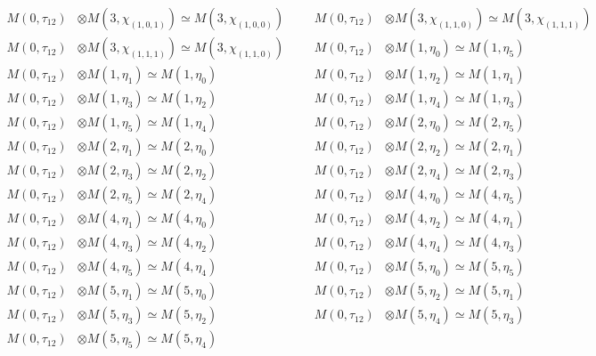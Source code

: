 \begin{align*}
M(0,\tau_{12}) &\otimes M(3,\chi_{(1,0,1)}) \simeq M(3,\chi_{(1,0,0)}) &&& M(0,\tau_{12}) &\otimes M(3,\chi_{(1,1,0)}) \simeq M(3,\chi_{(1,1,1)})\\
M(0,\tau_{12}) &\otimes M(3,\chi_{(1,1,1)}) \simeq M(3,\chi_{(1,1,0)}) &&& M(0,\tau_{12}) &\otimes M(1,\eta_{0}) \simeq M(1,\eta_{5})\\
M(0,\tau_{12}) &\otimes M(1,\eta_{1}) \simeq M(1,\eta_{0}) &&& M(0,\tau_{12}) &\otimes M(1,\eta_{2}) \simeq M(1,\eta_{1})\\
M(0,\tau_{12}) &\otimes M(1,\eta_{3}) \simeq M(1,\eta_{2}) &&& M(0,\tau_{12}) &\otimes M(1,\eta_{4}) \simeq M(1,\eta_{3})\\
M(0,\tau_{12}) &\otimes M(1,\eta_{5}) \simeq M(1,\eta_{4}) &&& M(0,\tau_{12}) &\otimes M(2,\eta_{0}) \simeq M(2,\eta_{5})\\
M(0,\tau_{12}) &\otimes M(2,\eta_{1}) \simeq M(2,\eta_{0}) &&& M(0,\tau_{12}) &\otimes M(2,\eta_{2}) \simeq M(2,\eta_{1})\\
M(0,\tau_{12}) &\otimes M(2,\eta_{3}) \simeq M(2,\eta_{2}) &&& M(0,\tau_{12}) &\otimes M(2,\eta_{4}) \simeq M(2,\eta_{3})\\
M(0,\tau_{12}) &\otimes M(2,\eta_{5}) \simeq M(2,\eta_{4}) &&& M(0,\tau_{12}) &\otimes M(4,\eta_{0}) \simeq M(4,\eta_{5})\\
M(0,\tau_{12}) &\otimes M(4,\eta_{1}) \simeq M(4,\eta_{0}) &&& M(0,\tau_{12}) &\otimes M(4,\eta_{2}) \simeq M(4,\eta_{1})\\
M(0,\tau_{12}) &\otimes M(4,\eta_{3}) \simeq M(4,\eta_{2}) &&& M(0,\tau_{12}) &\otimes M(4,\eta_{4}) \simeq M(4,\eta_{3})\\
M(0,\tau_{12}) &\otimes M(4,\eta_{5}) \simeq M(4,\eta_{4}) &&& M(0,\tau_{12}) &\otimes M(5,\eta_{0}) \simeq M(5,\eta_{5})\\
M(0,\tau_{12}) &\otimes M(5,\eta_{1}) \simeq M(5,\eta_{0}) &&& M(0,\tau_{12}) &\otimes M(5,\eta_{2}) \simeq M(5,\eta_{1})\\
M(0,\tau_{12}) &\otimes M(5,\eta_{3}) \simeq M(5,\eta_{2}) &&& M(0,\tau_{12}) &\otimes M(5,\eta_{4}) \simeq M(5,\eta_{3})\\
M(0,\tau_{12}) &\otimes M(5,\eta_{5}) \simeq M(5,\eta_{4})
\end{align*}

